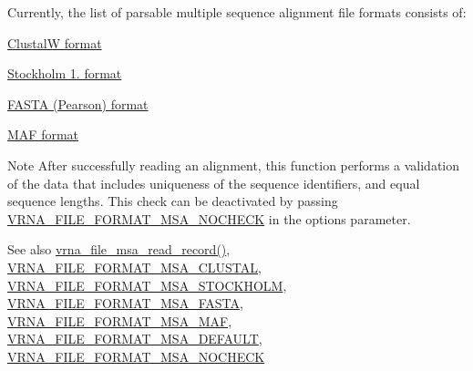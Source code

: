 Currently, the list of parsable multiple sequence alignment file formats consists of\+:
\begin{DoxyItemize}
\item \hyperlink{file_formats_msa-formats-clustal}{ClustalW format}
\item \hyperlink{file_formats_msa-formats-stockholm}{Stockholm 1. format}
\item \hyperlink{file_formats_msa-formats-fasta}{F\+A\+S\+TA (Pearson) format}
\item \hyperlink{file_formats_msa-formats-maf}{M\+AF format}
\end{DoxyItemize}\begin{DoxyNote}{Note}
After successfully reading an alignment, this function performs a validation of the data that includes uniqueness of the sequence identifiers, and equal sequence lengths. This check can be deactivated by passing \hyperlink{group__file__utils_ga229fb3778ecabea4782902b69fa48fd1}{V\+R\+N\+A\+\_\+\+F\+I\+L\+E\+\_\+\+F\+O\+R\+M\+A\+T\+\_\+\+M\+S\+A\+\_\+\+N\+O\+C\+H\+E\+CK} in the {\ttfamily options} parameter.
\end{DoxyNote}
\begin{DoxySeeAlso}{See also}
\hyperlink{group__file__utils_gad4203a438622b2df7bc2f16578d54799}{vrna\+\_\+file\+\_\+msa\+\_\+read\+\_\+record()}, \hyperlink{group__file__utils_ga79a23de2c7249f2cccd762e475c81859}{V\+R\+N\+A\+\_\+\+F\+I\+L\+E\+\_\+\+F\+O\+R\+M\+A\+T\+\_\+\+M\+S\+A\+\_\+\+C\+L\+U\+S\+T\+AL}, \hyperlink{group__file__utils_ga62be992445cd8ab2ad7a8fded944338b}{V\+R\+N\+A\+\_\+\+F\+I\+L\+E\+\_\+\+F\+O\+R\+M\+A\+T\+\_\+\+M\+S\+A\+\_\+\+S\+T\+O\+C\+K\+H\+O\+LM}, \hyperlink{group__file__utils_gacf6274a2c825f34e4131404665b00604}{V\+R\+N\+A\+\_\+\+F\+I\+L\+E\+\_\+\+F\+O\+R\+M\+A\+T\+\_\+\+M\+S\+A\+\_\+\+F\+A\+S\+TA}, \hyperlink{group__file__utils_gab3186d774c01570d2a47d0308eec4927}{V\+R\+N\+A\+\_\+\+F\+I\+L\+E\+\_\+\+F\+O\+R\+M\+A\+T\+\_\+\+M\+S\+A\+\_\+\+M\+AF}, \hyperlink{group__file__utils_ga4acc255373831856a8417b68de8a94c0}{V\+R\+N\+A\+\_\+\+F\+I\+L\+E\+\_\+\+F\+O\+R\+M\+A\+T\+\_\+\+M\+S\+A\+\_\+\+D\+E\+F\+A\+U\+LT}, \hyperlink{group__file__utils_ga229fb3778ecabea4782902b69fa48fd1}{V\+R\+N\+A\+\_\+\+F\+I\+L\+E\+\_\+\+F\+O\+R\+M\+A\+T\+\_\+\+M\+S\+A\+\_\+\+N\+O\+C\+H\+E\+CK}
\end{DoxySeeAlso}

